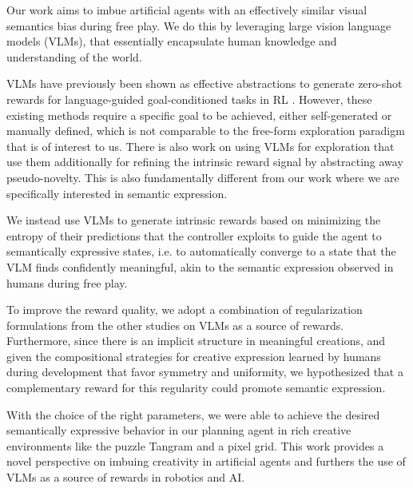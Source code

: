 Our work aims to imbue artificial agents with an effectively similar visual semantics bias during free play.
We do this by leveraging large vision language models (VLMs), that essentially encapsulate human knowledge and understanding of the world.

VLMs have previously been shown as effective abstractions to generate zero-shot rewards for language-guided goal-conditioned tasks in RL \citep{zest,negprompt,vlmrm,lamp}.
However, these existing methods require a specific goal to be achieved, either self-generated or manually defined, which is not comparable to the free-form exploration paradigm that is of interest to us.
There is also work on using VLMs for exploration \citep{vlmlang,vlmdistill} that use them additionally for refining the intrinsic reward signal by abstracting away pseudo-novelty.
This is also fundamentally different from our work where we are specifically interested in semantic expression.

We instead use VLMs to generate intrinsic rewards based on minimizing the entropy of their predictions that the controller exploits to guide the agent to semantically expressive states, i.e. to automatically converge to a state that the VLM finds confidently meaningful, akin to the semantic expression observed in humans during free play.

To improve the reward quality, we adopt a combination of regularization formulations from the other studies on VLMs as a source of rewards.
Furthermore, since there is an implicit structure in meaningful creations, and given the compositional strategies for creative expression learned by humans during development \citep{symmetry,compositional} that favor symmetry and uniformity, we hypothesized that a complementary reward for this regularity \citep{rair} could promote semantic expression.

With the choice of the right parameters, we were able to achieve the desired semantically expressive behavior in our planning agent in rich creative environments like the puzzle Tangram and a pixel grid.
This work provides a novel perspective on imbuing creativity in artificial agents and furthers the use of VLMs as a source of rewards in robotics and AI.
